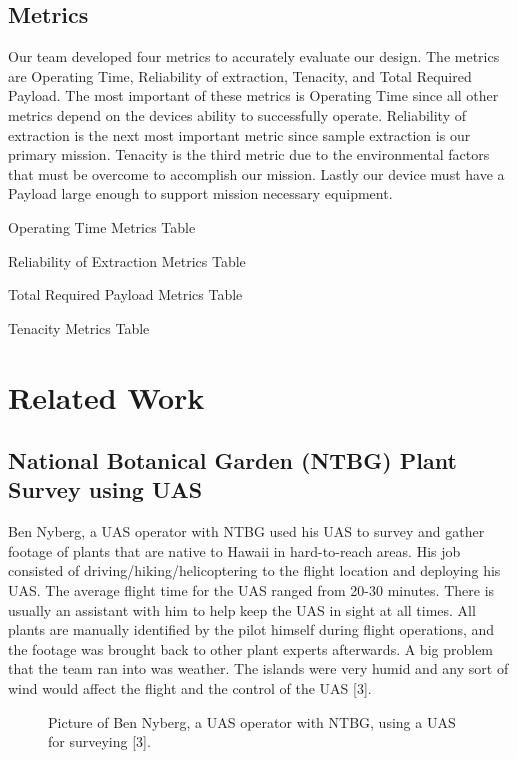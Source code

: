 \documentclass{wrcecapstone}
\begin{document}
\subsection{Metrics}
Our team developed four metrics to accurately evaluate our design. The metrics are Operating Time, Reliability of extraction, Tenacity, and Total Required Payload. The most important of these metrics is Operating Time since all other metrics depend on the devices ability to successfully operate. Reliability of extraction is the next most important metric since sample extraction is our primary mission.  Tenacity is the third metric due to the environmental factors that must be overcome to accomplish our mission. Lastly our device must have a Payload large enough to support mission necessary equipment.
\begin{table}
\caption{Operating Time Metrics Table}
\end{table}
\begin{table}
\caption{Reliability of Extraction Metrics Table}
\end{table}
\begin{table}
\caption{Total Required Payload Metrics Table}
\end{table}

\begin{table}
\caption{Tenacity Metrics Table}
\end{table} 






\section{Related Work}
\subsection{National Botanical Garden (NTBG) Plant Survey using UAS}
Ben Nyberg, a UAS operator with NTBG used his UAS to survey and gather footage of plants that are native to Hawaii in hard-to-reach areas.  His job consisted of driving/hiking/helicoptering to the flight location and deploying his UAS.  The average flight time for the UAS ranged from 20-30 minutes.  There is usually an assistant with him to help keep the UAS in sight at all times.  All plants are manually identified by the pilot himself during flight operations, and the footage was brought back to other plant experts afterwards.  A big problem that the team ran into was weather.  The islands were very humid and any sort of wind would affect the flight and the control of the UAS [3]. 
\begin{figure}
\caption{Picture of Ben Nyberg, a UAS operator with NTBG, using a UAS for surveying [3].}
\end{figure}
\end{document}

